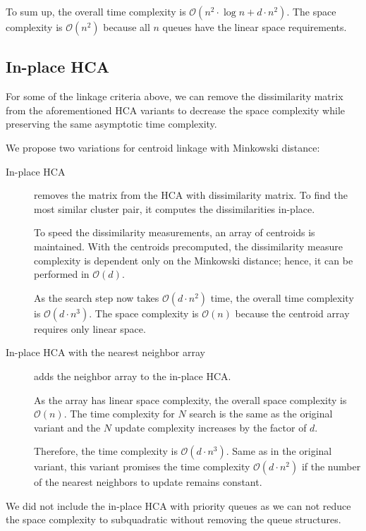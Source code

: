 To sum up, the overall time complexity is $\mathcal{O}(n^2\cdot\log{n}+d\cdot n^2)$. The space complexity is $\mathcal{O}(n^2)$ because all $n$ queues have the linear space requirements.


\subsection{In-place HCA}

For some of the linkage criteria above, we can remove the dissimilarity matrix from the aforementioned HCA variants to decrease the space complexity while preserving the same asymptotic time complexity.

We propose two variations for centroid linkage with Minkowski distance:

\begin{description}
	\item[In-place HCA] removes the matrix from the HCA with dissimilarity matrix. To find the most similar cluster pair, it computes the dissimilarities in-place. 
	
	To speed the dissimilarity measurements, an array of centroids is maintained. With the centroids precomputed, the dissimilarity measure complexity is dependent only on the Minkowski distance; hence, it can be performed in $\mathcal{O}(d)$.
	
	As the search step now takes $\mathcal{O}(d\cdot n^2)$ time, the overall time complexity is $\mathcal{O}(d\cdot n^3)$. The space complexity is $\mathcal{O}(n)$ because the centroid array requires only linear space.
	
	\item[In-place HCA with the nearest neighbor array] adds the neighbor array to the in-place HCA. 
	
	As the array has linear space complexity, the overall space complexity is $\mathcal{O}(n)$. The time complexity for $N$ search is the same as the original variant and the $N$ update complexity increases by the factor of $d$.
	
	Therefore, the time complexity is $\mathcal{O}(d\cdot n^3)$. Same as in the original variant, this variant promises the time complexity  $\mathcal{O}(d\cdot n^2)$ if the number of the nearest neighbors to update remains constant.
\end{description}

We did not include the in-place HCA with priority queues as we can not reduce the space complexity to subquadratic without removing the queue structures.

